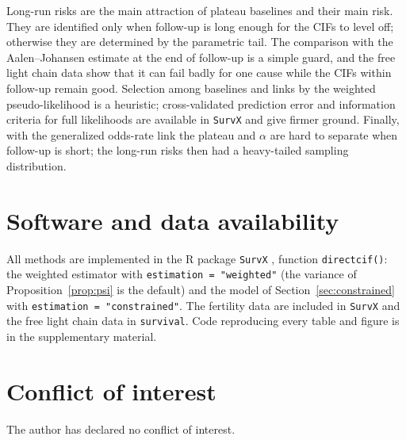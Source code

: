 \documentclass[11pt]{article}
\begin{document}
Long-run risks are the main attraction of plateau baselines and their main risk. They are
identified only when follow-up is long enough for the CIFs to level off; otherwise they are
determined by the parametric tail. The comparison with the Aalen--Johansen estimate at the end of
follow-up is a simple guard, and the free light chain data show that it can fail badly for one cause
while the CIFs within follow-up remain good. Selection among baselines and links by the weighted
pseudo-likelihood is a heuristic; cross-validated prediction error \citep[Chapter~7]{hastie2009}
and information criteria for full likelihoods \citep{burnham2002} are available in \texttt{SurvX}
and give firmer ground. Finally, with the generalized odds-rate link the plateau and $\alpha$ are
hard to separate when follow-up is short; the long-run risks then had a heavy-tailed sampling
distribution.

\section*{Software and data availability}
{\sloppy
All methods are implemented in the R package \texttt{SurvX} \citep{ezzatabadipour2026}, function
\texttt{directcif()}: the weighted estimator with \texttt{estimation = "weighted"} (the variance of
Proposition~\ref{prop:psi} is the default) and the model of Section~\ref{sec:constrained} with
\texttt{estimation = "constrained"}. The fertility data are included in \texttt{SurvX} and the
free light chain data in \texttt{survival}. Code reproducing every table and figure is in the
supplementary material.\par}

\section*{Conflict of interest}
The author has declared no conflict of interest.




\appendix
\end{document}
